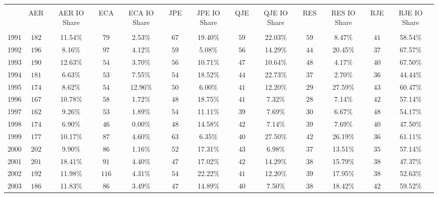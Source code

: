 
\begin{table}[!htbp] \centering 
  \caption{} 
  \label{} 
\footnotesize 
\begin{tabular}{@{\extracolsep{5pt}} ccccccccccccc} 
\\[-1.8ex]\hline 
\hline \\[-1.8ex] 
 & AER & AER IO Share & ECA & ECA IO Share & JPE & JPE IO Share & QJE & QJE IO Share & RES & RES IO Share & RJE & RJE IO Share \\ 
\hline \\[-1.8ex] 
1991 & $182$ & 11.54\% & $79$ & 2.53\% & $67$ & 19.40\% & $59$ & 22.03\% & $59$ & 8.47\% & $41$ & 58.54\% \\ 
1992 & $196$ & 8.16\% & $97$ & 4.12\% & $59$ & 5.08\% & $56$ & 14.29\% & $44$ & 20.45\% & $37$ & 67.57\% \\ 
1993 & $190$ & 12.63\% & $54$ & 3.70\% & $56$ & 10.71\% & $47$ & 10.64\% & $48$ & 4.17\% & $40$ & 67.50\% \\ 
1994 & $181$ & 6.63\% & $53$ & 7.55\% & $54$ & 18.52\% & $44$ & 22.73\% & $37$ & 2.70\% & $36$ & 44.44\% \\ 
1995 & $174$ & 8.62\% & $54$ & 12.96\% & $50$ & 6.00\% & $41$ & 12.20\% & $29$ & 27.59\% & $43$ & 60.47\% \\ 
1996 & $167$ & 10.78\% & $58$ & 1.72\% & $48$ & 18.75\% & $41$ & 7.32\% & $28$ & 7.14\% & $42$ & 57.14\% \\ 
1997 & $162$ & 9.26\% & $53$ & 1.89\% & $54$ & 11.11\% & $39$ & 7.69\% & $30$ & 6.67\% & $48$ & 54.17\% \\ 
1998 & $174$ & 6.90\% & $46$ & 0.00\% & $48$ & 14.58\% & $42$ & 7.14\% & $39$ & 7.69\% & $40$ & 47.50\% \\ 
1999 & $177$ & 10.17\% & $87$ & 4.60\% & $63$ & 6.35\% & $40$ & 27.50\% & $42$ & 26.19\% & $36$ & 61.11\% \\ 
2000 & $202$ & 9.90\% & $86$ & 1.16\% & $52$ & 17.31\% & $43$ & 6.98\% & $37$ & 13.51\% & $35$ & 57.14\% \\ 
2001 & $201$ & 18.41\% & $91$ & 4.40\% & $47$ & 17.02\% & $42$ & 14.29\% & $38$ & 15.79\% & $38$ & 47.37\% \\ 
2002 & $192$ & 11.98\% & $116$ & 4.31\% & $54$ & 22.22\% & $41$ & 12.20\% & $39$ & 17.95\% & $38$ & 52.63\% \\ 
2003 & $186$ & 11.83\% & $86$ & 3.49\% & $47$ & 14.89\% & $40$ & 7.50\% & $38$ & 18.42\% & $42$ & 59.52\% \\ 

\end{tabular}
\end{table}
